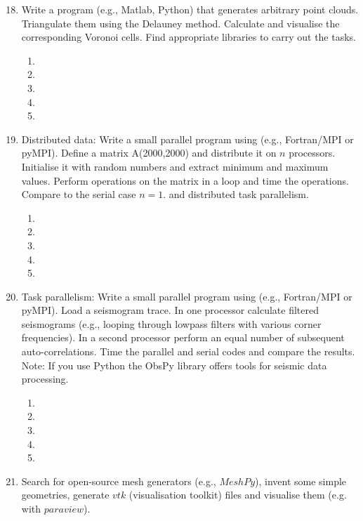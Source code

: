 \begin{enumerate}
\setcounter{enumi}{17}
\item
Write a program (e.g., Matlab, Python) that generates arbitrary point clouds. Triangulate them using the Delauney method. Calculate and visualise the corresponding Voronoi cells. Find appropriate libraries to carry out the tasks. 
\begin{enumerate}
\item[]
\item[]
\item[] 
\item[]
\item[] 
\end{enumerate}
\item
Distributed data: Write a small parallel program using (e.g., Fortran/MPI or pyMPI). Define a matrix A(2000,2000) and distribute it on $n$ processors. Initialise it with random numbers and extract minimum and maximum values. Perform operations on the matrix in a loop and time the operations. Compare to the serial case $n=1$. 
 and distributed task parallelism. 
 \begin{enumerate}
\item[]
\item[]
\item[] 
\item[]
\item[] 
\end{enumerate}
\item
Task parallelism: Write a small parallel program using (e.g., Fortran/MPI or pyMPI). Load a seismogram trace. In one processor calculate filtered seismograms (e.g., looping through lowpass filters with various corner frequencies). In a second processor perform an equal number of subsequent auto-correlations. Time the parallel and serial codes and compare the results. Note: If you use Python the ObsPy library offers tools for seismic data processing.   
\begin{enumerate}
\item[]
\item[]
\item[] 
\item[]
\item[] 
\end{enumerate}
\item
Search for open-source mesh generators (e.g., $MeshPy$), invent some simple geometries, generate $vtk$ (visualisation toolkit) files and visualise them (e.g. with $paraview$).

\end{enumerate}
